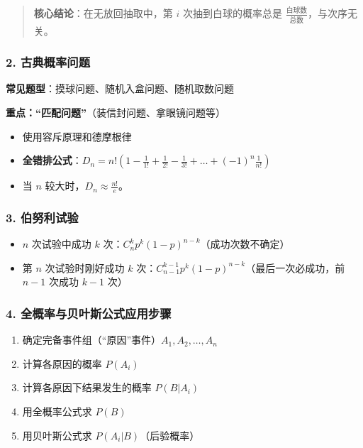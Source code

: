 \documentclass[12pt,a4paper]{ctexart}
\newenvironment{myquote}
  {\par\vspace{0.5em}\begin{quote}\sffamily\color{gray}}
  {\end{quote}\vspace{0.5em}}
\begin{document}
\begin{myquote}
    \textbf{核心结论}：在无放回抽取中，第 $i$ 次抽到白球的概率总是 $\frac{\text{白球数}}{\text{总数}}$，与次序无关。
\end{myquote}

\subsubsection{2. 古典概率问题}
\textbf{常见题型}：摸球问题、随机入盒问题、随机取数问题

\textbf{重点：“匹配问题”}（装信封问题、拿眼镜问题等）
\begin{itemize}[noitemsep]
    \item 使用容斥原理和德摩根律
    \item \textbf{全错排公式}：$\displaystyle D_n = n! \left(1 - \frac{1}{1!} + \frac{1}{2!} - \frac{1}{3!} + \dots + (-1)^n \frac{1}{n!}\right)$
    \item 当 $n$ 较大时，$D_n \approx \frac{n!}{e}$。
\end{itemize}

\subsubsection{3. 伯努利试验}
\begin{itemize}[noitemsep]
    \item $n$ 次试验中成功 $k$ 次：$C_n^k p^k (1-p)^{n-k}$（成功次数不确定）
    \item 第 $n$ 次试验时刚好成功 $k$ 次：$C_{n-1}^{k-1} p^k (1-p)^{n-k}$（最后一次必成功，前 $n-1$ 次成功 $k-1$ 次）
\end{itemize}

\subsubsection{4. 全概率与贝叶斯公式应用步骤}
\begin{enumerate}[noitemsep]
    \item 确定完备事件组（“原因”事件）$A_1, A_2, \dots, A_n$
    \item 计算各原因的概率 $P(A_i)$
    \item 计算各原因下结果发生的概率 $P(B|A_i)$
    \item 用全概率公式求 $P(B)$
    \item 用贝叶斯公式求 $P(A_i|B)$（后验概率）
\end{enumerate}

\newpage
\end{document}
